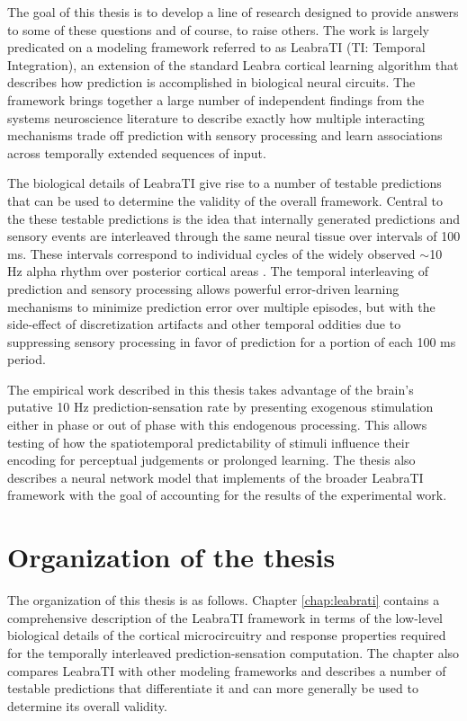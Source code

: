\documentclass[dwyatte_dissertation.tex]{subfiles}
\begin{document}
The goal of this thesis is to develop a line of research designed to provide answers to some of these questions and of course, to raise others. The work is largely predicated on a modeling framework referred to as LeabraTI (TI: Temporal Integration), an extension of the standard Leabra cortical learning algorithm \cite{OReillyMunakata00,OReillyMunakataFrankEtAl12} that describes how prediction is accomplished in biological neural circuits. The framework brings together a large number of independent findings from the systems neuroscience literature to describe exactly how multiple interacting mechanisms trade off prediction with sensory processing and learn associations across temporally extended sequences of input. 

The biological details of LeabraTI give rise to a number of testable predictions that can be used to determine the validity of the overall framework. Central to the these testable predictions is the idea that internally generated predictions and sensory events are interleaved through the same neural tissue over intervals of 100 ms. These intervals correspond to individual cycles of the widely observed $\sim$10 Hz alpha rhythm over posterior cortical areas \cite{PalvaPalva07,HanslmayrGrossKlimeschEtAl11,VanRullenBuschDrewesEtAl11}. The temporal interleaving of prediction and sensory processing allows powerful error-driven learning mechanisms to minimize prediction error over multiple episodes, but with the side-effect of discretization artifacts and other temporal oddities due to suppressing sensory processing in favor of prediction for a portion of each 100 ms period.

The empirical work described in this thesis takes advantage of the brain's putative 10 Hz prediction-sensation rate by presenting exogenous stimulation either in phase or out of phase with this endogenous processing. This allows testing of how the spatiotemporal predictability of stimuli influence their encoding for perceptual judgements or prolonged learning. The thesis also describes a neural network model that implements of the broader LeabraTI framework with the goal of accounting for the results of the experimental work.

\section{Organization of the thesis} 
The organization of this thesis is as follows. Chapter \ref{chap:leabrati} contains a comprehensive description of the LeabraTI framework in terms of the low-level biological details of the cortical microcircuitry and response properties required for the temporally interleaved prediction-sensation computation. The chapter also compares LeabraTI with other modeling frameworks and describes a number of testable predictions that differentiate it and can more generally be used to determine its overall validity. 
\end{document}
